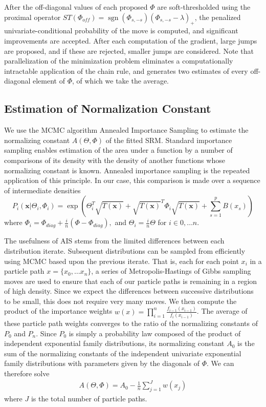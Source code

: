 \documentclass{samkoelleprelimworking}
\DeclareMathOperator{\sgn}{sgn}
\begin{document}
After the off-diagonal values of each proposed $\Phi$ are soft-thresholded using the proximal operator $ST(\Phi_{off}) = \sgn{ (\Phi_{s,-s} )} (\Phi_{s,-s} - \lambda)_+$, the penalized univariate-conditional probability of the move is computed, and significant improvements are accepted.  After each computation of the gradient, large jumps are proposed, and if these are rejected, smaller jumps are considered.  Note that parallelization of the minimization problem eliminates a computationally intractable application of the chain rule, and generates two estimates of every off-diagonal element of $\Phi$, of which we take the average.

\subsection{Estimation of Normalization Constant}
We use the MCMC algorithm Annealed Importance Sampling to estimate the normalizing constant $A(\Theta, \Phi)$ of the fitted SRM.  Standard importance sampling enables estimation of the area under a function by a number of comparisons of its density with the density of another functions whose normalizing constant is known.   Annealed importance sampling is the repeated application of this principle.  In our case, this comparison is made over a sequence of intermediate densities
\[P_i(\bm{x} \vert \Theta_i, \Phi_i) =  \exp(\Theta_i^T \sqrt{T(\bm{x})} + \sqrt{T(\bm{x})}^T\Phi_i \sqrt{T(\bm{x})} + \sum_{s=1}^p B(x_s)) \]
where $\Phi_i = \Phi_{diag} + \frac{i}{n} (\Phi - \Phi_{diag}),$ and $\Theta_i = \frac{i}{n}{\Theta}$ for $i \in 0, \dotsc n$.  

The usefulness of AIS stems from the limited differences between each distribution iterate.  Subsequent distributions can be sampled from efficiently using MCMC based upon the previous iterate.  That is, each for each point $x_i$ in a particle path $x = \{x_0, \dotsc x_n\}$, a series of Metropolis-Hastings of Gibbs sampling moves are used to ensure that each of our particle paths is remaining in a region of high density.  Since we expect the differences between successive distributions to be small, this does not require very many moves.  We then compute the product of the importance weights $w(x) = \prod_{i=1}^n \frac{f_{i-1}(x_{i-1})}{f_{i}(x_{i-1})}$.  The average of these particle path weights converges to the ratio of the normalizing constants of $P_0$ and $P_n$.  Since $P_0$ is simply a probability law composed of the product of independent exponential family distributions, its normalizing constant $A_0$ is the sum of the normalizing constants of the independent univariate exponential family distributions with parameters given by the diagonals of $\Phi$.  We can therefore solve
\begin{align}
A(\Theta,\Phi) = A_0 - \frac{1}{n} \sum_{j=1}^{J} w(x_j)
\end{align}
where $J$ is the total number of particle paths.  
\end{document}
